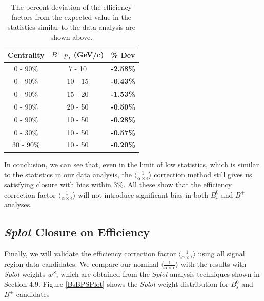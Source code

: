 \begin{table}[h]
\begin{center}
\caption{The  percent deviation of the efficiency factors from the expected value in the statistics similar to the data analysis are shown above.}
\vspace{1em}
\label{BPEffClosure}
  \begin{tabular}{| c | c |c |}
    \hline
     Centrality &   $B^+$  $p_T$ (GeV/c) &   \% Dev \\
    \hline
    \hline
0 - 90\% & 7 - 10 &  \textbf{-2.58\% }   \\ 
0 - 90\% & 10 - 15 &  \textbf{-0.43\% }   \\ 
0 - 90\% & 15 - 20 &   \textbf{-1.53\% }   \\ 
0 - 90\% & 20 - 50 &  \textbf{-0.50\% }   \\ 
0 - 90\% & 10 - 50 &  \textbf{-0.28\% }   \\ 
0 - 30\% & 10 - 50 &   \textbf{-0.57\% }   \\ 
30 - 90\% & 10 - 50 & \textbf{-0.20\% }   \\ 
    \hline
    \hline
\end{tabular}
\end{center}
\end{table}


In conclusion, we can see that, even in the limit of low statistics, which is similar to the statistics in our data analysis, the $\langle \frac{1}{\alpha \times \epsilon} \rangle$ correction method still gives us satisfying closure with bias within 3\%. All these show that the efficiency correction factor $\langle \frac{1}{\alpha \times \epsilon} \rangle$ will not introduce significant bias in both $B^0_s$ and $B^+$ analyses.


\subsection{\textit{Splot} Closure on Efficiency}

Finally, we will validate the efficiency correction factor $\langle \frac{1}{\alpha \times \epsilon} \rangle$ using all signal region data candidates. We compare our nominal $\langle \frac{1}{\alpha \times \epsilon} \rangle$ with the results with \textit{Splot} weights $w^S$, which are obtained from the \textit{Splot} analysis techniques shown in Section 4.9. Figure \ref{BsBPSPlot} shows the \textit{Splot} weight distribution for $B^0_s$ and $B^+$ candidates  


